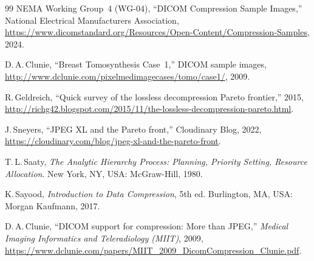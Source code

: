 \documentclass[journal]{IEEEtran}
\begin{document}
\begin{thebibliography}{99}
NEMA Working Group~4 (WG-04),
``DICOM Compression Sample Images,''
National Electrical Manufacturers Association,
\url{https://www.dicomstandard.org/Resources/Open-Content/Compression-Samples},
2024.

D.\,A.\,Clunie,
``Breast Tomosynthesis Case~1,'' DICOM sample images,
\url{http://www.dclunie.com/pixelmedimagecases/tomo/case1/}, 2009.

R.\,Geldreich, ``Quick survey of the lossless decompression Pareto frontier,''
2015, \url{http://richg42.blogspot.com/2015/11/the-lossless-decompression-pareto.html}.

J.\,Sneyers, ``JPEG XL and the Pareto front,'' Cloudinary Blog, 2022,
\url{https://cloudinary.com/blog/jpeg-xl-and-the-pareto-front}.

T.\,L.\,Saaty, \textit{The Analytic Hierarchy Process: Planning, Priority
Setting, Resource Allocation}. New York, NY, USA: McGraw-Hill, 1980.

K.\,Sayood, \textit{Introduction to Data Compression}, 5th ed.
Burlington, MA, USA: Morgan Kaufmann, 2017.

D.\,A.\,Clunie, ``DICOM support for compression: More than JPEG,''
\textit{Medical Imaging Informatics and Teleradiology (MIIT)}, 2009,
\url{https://www.dclunie.com/papers/MIIT_2009_DicomCompression_Clunie.pdf}.

\end{thebibliography}
\end{document}

